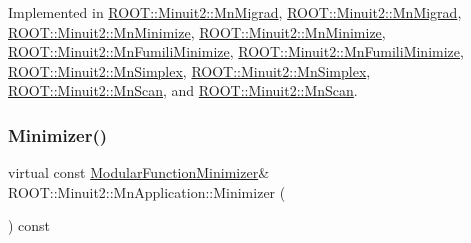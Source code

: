 Implemented in \mbox{\hyperlink{classROOT_1_1Minuit2_1_1MnMigrad_a98fa0ce74bf180a287093ac677e8644c}{R\+O\+O\+T\+::\+Minuit2\+::\+Mn\+Migrad}}, \mbox{\hyperlink{classROOT_1_1Minuit2_1_1MnMigrad_a98fa0ce74bf180a287093ac677e8644c}{R\+O\+O\+T\+::\+Minuit2\+::\+Mn\+Migrad}}, \mbox{\hyperlink{classROOT_1_1Minuit2_1_1MnMinimize_a879bb789f98c72f9a90a327fc7bb48fd}{R\+O\+O\+T\+::\+Minuit2\+::\+Mn\+Minimize}}, \mbox{\hyperlink{classROOT_1_1Minuit2_1_1MnMinimize_a879bb789f98c72f9a90a327fc7bb48fd}{R\+O\+O\+T\+::\+Minuit2\+::\+Mn\+Minimize}}, \mbox{\hyperlink{classROOT_1_1Minuit2_1_1MnFumiliMinimize_a96eb0cf96ae7ec874f912b6d2b3e7990}{R\+O\+O\+T\+::\+Minuit2\+::\+Mn\+Fumili\+Minimize}}, \mbox{\hyperlink{classROOT_1_1Minuit2_1_1MnFumiliMinimize_a96eb0cf96ae7ec874f912b6d2b3e7990}{R\+O\+O\+T\+::\+Minuit2\+::\+Mn\+Fumili\+Minimize}}, \mbox{\hyperlink{classROOT_1_1Minuit2_1_1MnSimplex_a8fa3495353e667d85e7dbeaffa94b94c}{R\+O\+O\+T\+::\+Minuit2\+::\+Mn\+Simplex}}, \mbox{\hyperlink{classROOT_1_1Minuit2_1_1MnSimplex_a8fa3495353e667d85e7dbeaffa94b94c}{R\+O\+O\+T\+::\+Minuit2\+::\+Mn\+Simplex}}, \mbox{\hyperlink{classROOT_1_1Minuit2_1_1MnScan_a9bebaf56360ff70aac6f47590227d8b5}{R\+O\+O\+T\+::\+Minuit2\+::\+Mn\+Scan}}, and \mbox{\hyperlink{classROOT_1_1Minuit2_1_1MnScan_a9bebaf56360ff70aac6f47590227d8b5}{R\+O\+O\+T\+::\+Minuit2\+::\+Mn\+Scan}}.

\mbox{\label{classROOT_1_1Minuit2_1_1MnApplication_a5a8e1e2658b731b5f4023dd1b1594223}} 
\subsubsection{\texorpdfstring{Minimizer()}{Minimizer()}\hspace{0.1cm}{\footnotesize\ttfamily [2/2]}}
{\footnotesize\ttfamily virtual const \mbox{\hyperlink{classROOT_1_1Minuit2_1_1ModularFunctionMinimizer}{Modular\+Function\+Minimizer}}\& R\+O\+O\+T\+::\+Minuit2\+::\+Mn\+Application\+::\+Minimizer (\begin{DoxyParamCaption}{ }\end{DoxyParamCaption}) const\hspace{0.3cm}{\ttfamily [pure virtual]}}



